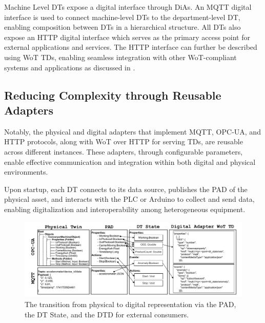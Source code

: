 Machine Level \acp{DT} expose a digital interface through \acp{DiA}. 
%
An MQTT digital interface is used to connect machine-level \acp{DT} to the department-level \ac{DT}, enabling composition between \acp{DT} in a hierarchical structure. 
%
All \acp{DT} also expose an \ac{HTTP} digital interface which serves as the primary access point for external applications and services.
%
The \ac{HTTP} interface can further be described using \ac{WoT} \acp{TD}, enabling seamless integration with other \ac{WoT}-compliant systems and applications as discussed in .

\subsection{Reducing Complexity through Reusable Adapters}

Notably, the physical and digital adapters that implement MQTT, OPC-UA, and HTTP protocols, along with \ac{WoT} over HTTP for serving \acp{TD}, are reusable across different instances.
These adapters, through configurable parameters, enable effective communication and integration within both digital and physical environments.

Upon startup, each \ac{DT} connects to its data source, publishes the \ac{PAD} of the physical asset, and interacts with the PLC or Arduino to collect and send data, enabling digitalization and interoperability among heterogeneous equipment. 

\begin{figure}
    \centering
    \includegraphics[width=\textwidth]{figures/dt-interoperability/dt_interoperability-pad_dt_wot.pdf}
    \caption{The transition from physical to digital representation via the \ac{PAD}, the \ac{DT} State, and the \ac{DTD} for external consumers.}
    \label{fig:pad_dt_wot}
\end{figure}


